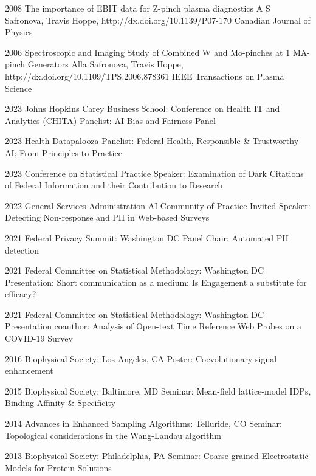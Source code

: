 \documentclass[]{scrartcl}
\begin{document}
\begin{cleanCV}
\Paper
{2008}
{The importance of EBIT data for Z-pinch plasma diagnostics}
{A S Safronova, Travis Hoppe, \etal}
{http://dx.doi.org/10.1139/P07-170}
{Canadian Journal of Physics}

\Paper
{2006}
{Spectroscopic and Imaging Study of Combined W and Mo-pinches 
  at 1 MA-pinch Generators}
{Alla Safronova, Travis Hoppe, \etal}
{http://dx.doi.org/10.1109/TPS.2006.878361}
{IEEE Transactions on Plasma Science}





\WorkExperienceX
{2023}
{Johns Hopkins Carey Business School: Conference on Health IT and Analytics (CHITA)}
{Panelist: AI Bias and Fairness Panel}

\WorkExperienceX
{2023}
{Health Datapalooza}
{Panelist: Federal Health, Responsible \& Trustworthy AI: From Principles to Practice}

\WorkExperienceX
{2023}
{Conference on Statistical Practice}
{Speaker: Examination of Dark Citations of Federal Information and their Contribution to Research}

\WorkExperienceX
{2022}
{General Services Administration AI Community of Practice}
{Invited Speaker: Detecting Non-response and PII in Web-based Surveys}

\WorkExperienceX
{2021}
{Federal Privacy Summit: Washington DC}
{Panel Chair: Automated PII detection}

\WorkExperienceX
{2021}
{Federal Committee on Statistical Methodology: Washington DC}
{Presentation: Short communication as a medium: Is Engagement a substitute for efficacy?}

\WorkExperienceX
{2021}
{Federal Committee on Statistical Methodology: Washington DC}
{Presentation coauthor: Analysis of Open-text Time Reference Web Probes on a COVID-19 Survey}

\WorkExperienceX
{2016}
{Biophysical Society: Los Angeles, CA}
{Poster: Coevolutionary signal enhancement}


\WorkExperienceX
{2015}
{Biophysical Society: Baltimore, MD}
{Seminar: Mean-field lattice-model IDPs, Binding Affinity \& Specificity}

\WorkExperienceX
{2014}
{Advances in Enhanced Sampling Algorithms: Telluride, CO}
{Seminar: Topological considerations in the Wang-Landau algorithm}

\WorkExperienceX
{2013}
{Biophysical Society: Philadelphia, PA}
{Seminar: Coarse-grained Electrostatic Models for Protein Solutions}


\end{cleanCV}
\end{document}
